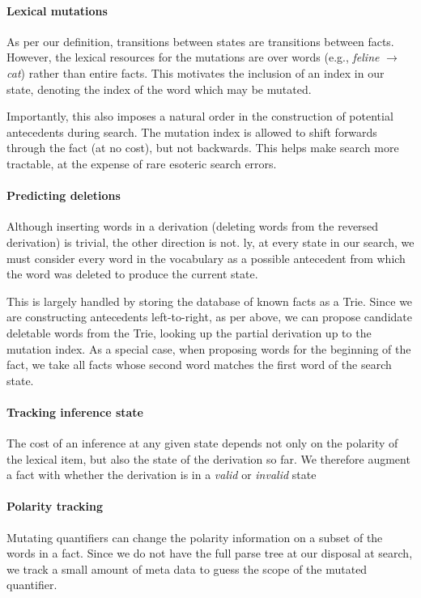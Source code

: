 \paragraph{Lexical mutations}
As per our definition, transitions between states are transitions 
  between facts.
However, the lexical resources for the mutations are over words
  (e.g., \textit{feline} $\rightarrow$ \textit{cat}) rather than
  entire facts.
This motivates the inclusion of an index in our state, denoting the
  index of the word which may be mutated.

Importantly, this also imposes a natural order in the construction of
  potential antecedents during search.
The mutation index is allowed to shift forwards through the
  fact (at no cost), but not backwards.
This helps make search more tractable, at the expense of rare
  esoteric search errors.


\paragraph{Predicting deletions}
Although inserting words in a derivation (deleting words from
  the reversed derivation) is trivial, the other direction is not.
\naive ly, at every state in our search, we must consider every word in
  the vocabulary as a possible antecedent from which the word was deleted
  to produce the current state.

This is largely handled by storing the database of known facts as a
  Trie.
Since we are constructing antecedents left-to-right, as per above,
  we can propose candidate deletable words from the Trie, looking up
  the partial derivation up to the mutation index.
As a special case, when proposing words for the beginning of the
  fact, we take all facts whose second word matches the first word
  of the search state.

\paragraph{Tracking inference state}
The cost of an inference at any given state depends not only on the
  polarity of the lexical item, but also the state of the derivation
  so far.
We therefore augment a fact with whether the derivation is in a
  \textit{valid} or \textit{invalid} state

\paragraph{Polarity tracking}
Mutating quantifiers can change the polarity information on a subset
  of the words in a fact.
Since we do not have the full parse tree at our disposal at search,
  we track a small amount of meta data to guess the scope of the
  mutated quantifier.


